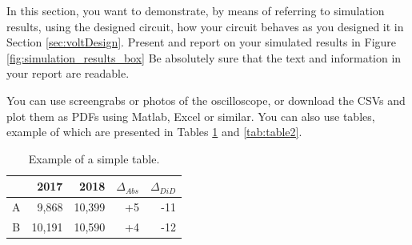 
In this section, you want to demonstrate, by means of referring to simulation results, using the designed circuit, how your circuit behaves as you designed it in Section \ref{sec:voltDesign}. Present and report on your simulated results in Figure \ref{fig:simulation_results_box} Be absolutely sure that the text and information in your report are readable. 

You can use screengrabs or photos of the oscilloscope, or download the CSVs and plot them as PDFs using Matlab, Excel or similar. 
You can also use tables, example of which are presented in Tables \ref{tab:table1} and \ref{tab:table2}.


\begin{table}
        \centering
        \footnotesize
        \caption{Example of a simple table.}
         \begin{tabular}{c@{\qquad}rrrr}
          \toprule
             & 2017 & 2018 & $\Delta_{Abs}$ & $\Delta_{DiD}$\\
          \midrule
          A & 9,868      & 10,399 & +5 & -11\\
          B & 10,191     & 10,590 & +4 & -12\\
          \bottomrule
        \end{tabular}
     \label{tab:table1}
\end{table}


